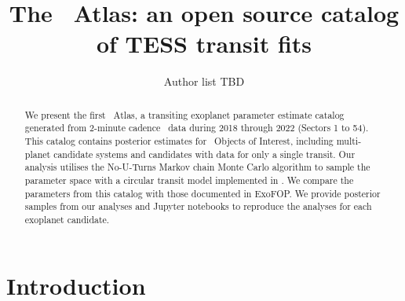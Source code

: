 \documentclass[linenumbers,floatfix,ApJL,twocolumn]{aastex631}
\begin{document}
\title{The \tess\ Atlas: an open source catalog of TESS transit fits}


\author{Author list TBD}
% 





\begin{abstract}
We present the first \tess\ Atlas, a transiting exoplanet parameter estimate catalog generated from 2-minute cadence \tess\ data during 2018 through 2022 (Sectors 1 to 54).
This catalog contains posterior estimates for \red{\numAnalysed} \tess\ Objects of Interest, including \red{\numAnalysedMulti} multi-planet candidate systems and \red{\numAnalysedSingle} candidates with data for only a single transit.
Our analysis utilises the No-U-Turns Markov chain Monte Carlo algorithm to sample the parameter space with a circular transit model implemented in \exoplanet.
We compare the parameters from this catalog with those documented in ExoFOP.
We provide posterior samples from our analyses and Jupyter notebooks to reproduce the analyses for each exoplanet candidate.
\end{abstract}




\section{Introduction} \label{sec:intro}
\end{document}
